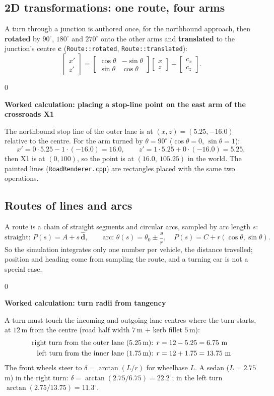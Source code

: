 \documentclass[11pt,a4paper]{article}
\newcommand{\code}[1]{\texttt{\small #1}}
\newenvironment{calc}[1]{\par\smallskip\noindent\begin{minipage}{\textwidth}\setlength{\fboxsep}{6pt}\begin{lrbox}{0}\begin{minipage}{0.955\textwidth}\textbf{Worked calculation: #1}\par\smallskip}{\end{minipage}\end{lrbox}\fbox{\usebox{0}}\end{minipage}\par\smallskip}
\begin{document}
\subsection{2D transformations: one route, four arms}
A turn through a junction is authored once, for the northbound approach, then \textbf{rotated} by $90^\circ$, $180^\circ$ and $270^\circ$ onto the other arms and \textbf{translated} to the junction's centre $\mathbf{c}$ (\code{Route::rotated}, \code{Route::translated}):
\[
\begin{bmatrix}x'\\z'\end{bmatrix} = \begin{bmatrix}\cos\theta & -\sin\theta\\ \sin\theta & \cos\theta\end{bmatrix}\begin{bmatrix}x\\z\end{bmatrix} + \begin{bmatrix}c_x\\c_z\end{bmatrix}.
\]
\begin{calc}{placing a stop-line point on the east arm of the crossroads X1}
The northbound stop line of the outer lane is at $(x,z) = (5.25, -16.0)$ relative to the centre. For the arm turned by $\theta = 90^\circ$ ($\cos\theta = 0$, $\sin\theta = 1$):
\[
x' = 0\cdot 5.25 - 1\cdot(-16.0) = 16.0, \qquad z' = 1\cdot 5.25 + 0\cdot(-16.0) = 5.25,
\]
then X1 is at $(0, 100)$, so the point is at $(16.0,\ 105.25)$ in the world. The painted lines (\code{RoadRenderer.cpp}) are rectangles placed with the same two operations.
\end{calc}

\subsection{Routes of lines and arcs}
A route is a chain of straight segments and circular arcs, sampled by arc length $s$:
\[
\text{straight: } P(s) = A + s\,\hat{\mathbf{d}}, \qquad \text{arc: } \theta(s) = \theta_0 \pm \frac{s}{r},\quad P(s) = C + r(\cos\theta, \sin\theta).
\]
So the simulation integrates only one number per vehicle, the distance travelled; position and heading come from sampling the route, and a turning car is not a special case.

\begin{calc}{turn radii from tangency}
A turn must touch the incoming and outgoing lane centres where the turn starts, at $12$\,m from the centre (road half width $7$\,m + kerb fillet $5$\,m):
\begin{align*}
\text{right turn from the outer lane (5.25\,m): } r &= 12 - 5.25 = 6.75\text{ m}\\
\text{left turn from the inner lane (1.75\,m): } r &= 12 + 1.75 = 13.75\text{ m}
\end{align*}
The front wheels steer to $\delta = \arctan(L/r)$ for wheelbase $L$. A sedan ($L = 2.75$\,m) in the right turn: $\delta = \arctan(2.75/6.75) = 22.2^\circ$; in the left turn $\arctan(2.75/13.75) = 11.3^\circ$.
\end{calc}
\end{document}
